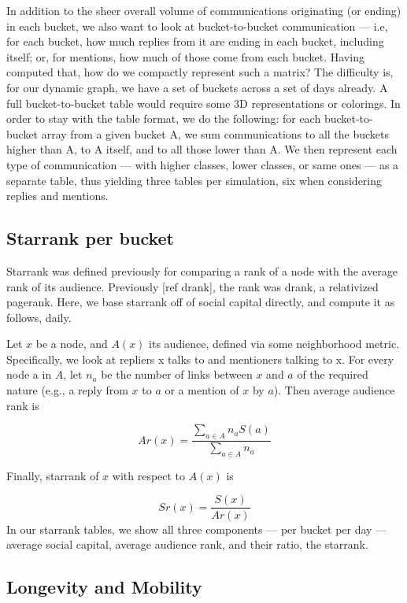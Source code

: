 \documentclass[10pt,oneside]{memoir}
\begin{document}
\begin{Spacing}{2}
In addition to the sheer overall volume of communications originating (or ending) in each bucket, we also want to look at bucket-to-bucket communication --- i.e, for each bucket, how much replies from it are ending in each bucket, including itself; or, for mentions, how much of those come from each bucket.
Having computed that, how do we compactly represent such a matrix?  The difficulty is, for our dynamic graph, we have a set of buckets across a set of days already.  A full bucket-to-bucket table would require some 3D representations or colorings.  In order to stay with the table format, we do the following: for each bucket-to-bucket array from a given bucket A, we sum communications to all the buckets higher than A, to A itself, and to all those lower than A.  We then represent each type of communication --- with higher classes, lower classes, or same ones --- as a separate table, thus yielding three tables per simulation, six when considering replies and mentions.


\subsection{Starrank per bucket}
\label{starrankperbucket}

Starrank was defined previously for comparing a rank of a node with the average rank of its audience.  Previously [ref drank], the rank was drank, a relativized pagerank.  Here, we base starrank off of social capital directly, and compute it as follows, daily.



Let $x$ be a node, and $A(x)$ its audience, defined via some neighborhood metric.  Specifically, we look at repliers x talks to and mentioners talking to x.  For every node a in $A$, let $n_a$ be the number of links between $x$ and $a$ of the required nature (e.g., a reply from $x$ to $a$ or a mention of $x$ by $a$).  Then average audience rank is

\[ Ar(x) = \frac{\sum_{a \in A} n_a S(a)}{\sum_{a \in A} n_a} \]

Finally, starrank of $x$ with respect to $A(x)$ is

\[ Sr(x) = \frac{S(x)}{Ar(x)} \]
In our starrank tables, we show all three components --- per bucket per day --- average social capital, average audience rank, and their ratio, the starrank.


\subsection{Longevity and Mobility}
\label{longevityandmobility}


\end{Spacing}
\end{document}
